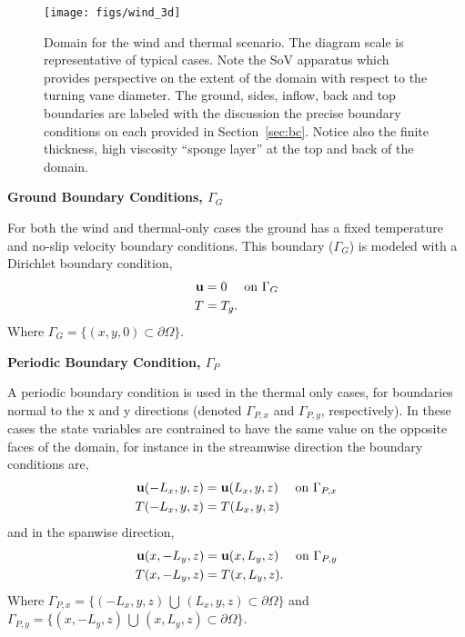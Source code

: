 \begin{figure}[!htb]
  \begin{center}
   \texttt{[image: figs/wind\_3d]}
    \caption{Domain for the wind and thermal scenario. The diagram scale
   is representative of typical cases. Note the SoV apparatus which
   provides perspective on the extent of the domain with respect to the
   turning vane diameter. The ground, sides, inflow, back and top
   boundaries are labeled with the discussion the precise boundary
   conditions on each provided in Section~\ref{sec:bc}. Notice also the
   finite thickness, high viscosity ``sponge layer'' at the top and back
   of the domain.}   
    \label{fig:wind3d}
  \end{center}
\end{figure}

\textbf{Ground Boundary Conditions, $\Gamma_G$} 

For both the wind and thermal-only cases the ground has a fixed
temperature and no-slip velocity boundary conditions. This boundary 
($\Gamma_G$) is modeled with a Dirichlet boundary condition, 
\begin{align}
 {\bf u} &= 0 \quad \text{ on } \Gamma_G \\
 T &= T_g.
\end{align}
Where $\Gamma_G = \{(x,y,0) \subset \partial \Omega \} $. 

%
%
%
\textbf{Periodic Boundary Condition, $\Gamma_P$} 

A periodic boundary condition is used in the thermal only cases, 
for boundaries normal to the x and y directions 
(denoted $\Gamma_{P,x}$ and $\Gamma_{P,y}$, respectively). In these
cases the state variables  
are contrained to have the same value on the opposite faces of the domain, 
for instance in the streamwise direction the boundary conditions are, 
\begin{align}
 {\bf u}(-L_x,y,z) &= {\bf u}(L_x,y,z) \quad \text{ on } \Gamma_{P,x} \\
 T(-L_x,y,z) &= T(L_x,y,z)
\end{align}
and in the spanwise direction,
\begin{align}
 {\bf u}(x,-L_y,z) &= {\bf u}(x,L_y,z) \quad \text{ on } \Gamma_{P,y} \\
 T(x,-L_y,z) &= T(x,L_y,z). 
\end{align}
Where $\Gamma_{P,x} = \{(-L_x,y,z) \, \bigcup \, (L_x,y,z) \subset \partial
\Omega \}$  
and $\Gamma_{P,y} = \{(x,-L_y,z) \, \bigcup \, (x,L_y,z) \subset \partial
\Omega \}$. 

